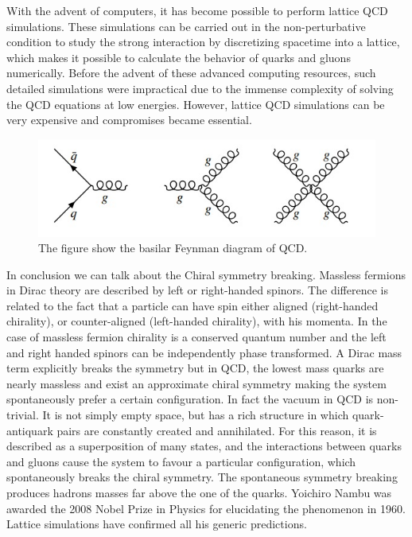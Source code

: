 \documentclass[12pt,a4paper]{book}
\begin{document}
	With the advent of computers, it has become possible to perform lattice QCD simulations. These simulations can be carried out in the non-perturbative condition to study the strong interaction by discretizing spacetime into a lattice, which makes it possible to calculate the behavior of quarks and gluons numerically. Before the advent of these advanced computing resources, such detailed simulations were impractical due to the immense complexity of solving the QCD equations at low energies. However, lattice QCD simulations can be very expensive and compromises became essential.
	
	\begin{figure}		
		\centering
		\includegraphics[width=0.7\linewidth]{pictures/QCD_vertices.jpeg}
		\caption{The figure show the basilar Feynman diagram of QCD.}
		\label{fig:QCD_vertices} 
	\end{figure}
	
	In conclusion we can talk about the Chiral symmetry breaking. Massless fermions in Dirac theory are described by left or right-handed spinors. The difference is related to the fact that a particle can have spin either aligned (right-handed chirality), or counter-aligned (left-handed chirality), with his momenta. In the case of massless fermion chirality is a conserved quantum number and the left and right handed spinors can be independently phase transformed. A Dirac mass term explicitly breaks the symmetry but in QCD, the lowest mass quarks are nearly massless and exist an approximate chiral symmetry making the system spontaneously prefer a certain configuration. In fact the vacuum in QCD is non-trivial. It is not simply empty space, but has a rich structure in which quark-antiquark pairs are constantly created and annihilated. For this reason, it is described as a superposition of many states, and the interactions between quarks and gluons cause the system to favour a particular configuration, which spontaneously breaks the chiral symmetry. The spontaneous symmetry breaking produces hadrons masses far above the one of the quarks. Yoichiro Nambu was awarded the 2008 Nobel Prize in Physics for elucidating the phenomenon in 1960. Lattice simulations have confirmed all his generic predictions. \cite{Peskin:1995ev}
	
\end{document}
